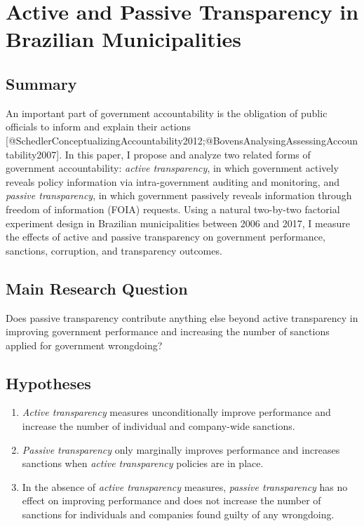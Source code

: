 \documentclass[]{article}
\title{}
\author{}
\date{}
\begin{document}
\hypertarget{title3}{%
\section{Active and Passive Transparency in Brazilian
Municipalities}\label{title3}}

\hypertarget{summary}{%
\subsection{Summary}\label{summary}}

An important part of government accountability is the obligation of
public officials to inform and explain their actions
{[}@SchedlerConceptualizingAccountability2012;@BovensAnalysingAssessingAccountability2007{]}.
In this paper, I propose and analyze two related forms of government
accountability: \emph{active transparency}, in which government actively
reveals policy information via intra-government auditing and monitoring,
and \emph{passive transparency}, in which government passively reveals
information through freedom of information (FOIA) requests. Using a
natural two-by-two factorial experiment design in Brazilian
municipalities between 2006 and 2017, I measure the effects of active
and passive transparency on government performance, sanctions,
corruption, and transparency outcomes.

\hypertarget{main-research-question}{%
\subsection{Main Research Question}\label{main-research-question}}

Does passive transparency contribute anything else beyond active
transparency in improving government performance and increasing the
number of sanctions applied for government wrongdoing?

\hypertarget{hypotheses}{%
\subsection{Hypotheses}\label{hypotheses}}

\begin{enumerate}
\item
  \emph{Active transparency} measures unconditionally improve
  performance and increase the number of individual and company-wide
  sanctions.
\item
  \emph{Passive transparency} only marginally improves performance and
  increases sanctions when \emph{active transparency} policies are in
  place.
\item
  In the absence of \emph{active transparency} measures, \emph{passive
  transparency} has no effect on improving performance and does not
  increase the number of sanctions for individuals and companies found
  guilty of any wrongdoing.
\end{enumerate}
\end{document}
